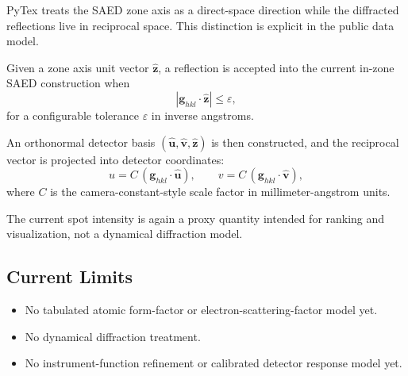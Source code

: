 PyTex treats the SAED zone axis as a direct-space direction while the diffracted reflections live in reciprocal space. This distinction is explicit in the public data model.

Given a zone axis unit vector $\hat{\mathbf{z}}$, a reflection is accepted into the current in-zone SAED construction when
\[
|\mathbf{g}_{hkl} \cdot \hat{\mathbf{z}}| \le \varepsilon,
\]
for a configurable tolerance $\varepsilon$ in inverse angstroms.

An orthonormal detector basis $(\hat{\mathbf{u}}, \hat{\mathbf{v}}, \hat{\mathbf{z}})$ is then constructed, and the reciprocal vector is projected into detector coordinates:
\[
u = C \, (\mathbf{g}_{hkl} \cdot \hat{\mathbf{u}}), \qquad
v = C \, (\mathbf{g}_{hkl} \cdot \hat{\mathbf{v}}),
\]
where $C$ is the camera-constant-style scale factor in millimeter-angstrom units.

The current spot intensity is again a proxy quantity intended for ranking and visualization, not a dynamical diffraction model.

\subsection{Current Limits}

\begin{itemize}
  \item No tabulated atomic form-factor or electron-scattering-factor model yet.
  \item No dynamical diffraction treatment.
  \item No instrument-function refinement or calibrated detector response model yet.
\end{itemize}
